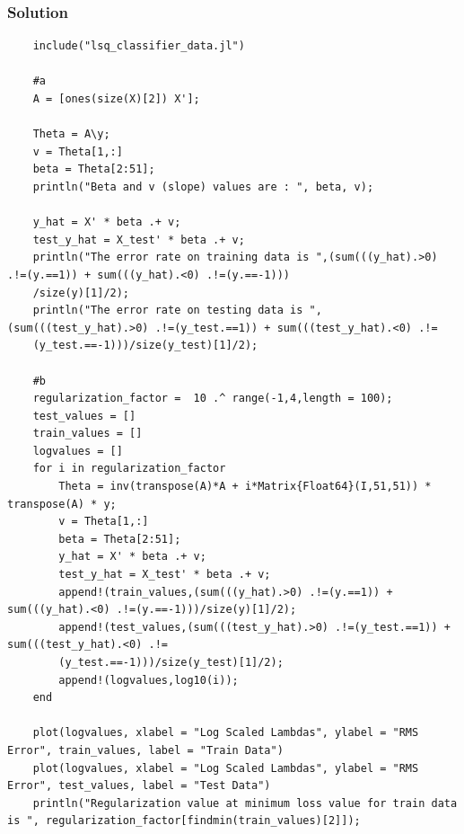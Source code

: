 \documentclass{article}
\begin{document}
\subsubsection*{Solution}
    \begin{verbatim}
    include("lsq_classifier_data.jl")
    
    #a
    A = [ones(size(X)[2]) X'];
    
    Theta = A\y;
    v = Theta[1,:]
    beta = Theta[2:51];
    println("Beta and v (slope) values are : ", beta, v);
    
    y_hat = X' * beta .+ v;
    test_y_hat = X_test' * beta .+ v;
    println("The error rate on training data is ",(sum(((y_hat).>0) .!=(y.==1)) + sum(((y_hat).<0) .!=(y.==-1)))
    /size(y)[1]/2);
    println("The error rate on testing data is ",(sum(((test_y_hat).>0) .!=(y_test.==1)) + sum(((test_y_hat).<0) .!=
    (y_test.==-1)))/size(y_test)[1]/2);
    
    #b
    regularization_factor =  10 .^ range(-1,4,length = 100);
    test_values = []
    train_values = []
    logvalues = []
    for i in regularization_factor
        Theta = inv(transpose(A)*A + i*Matrix{Float64}(I,51,51)) * transpose(A) * y;
        v = Theta[1,:]
        beta = Theta[2:51];
        y_hat = X' * beta .+ v;
        test_y_hat = X_test' * beta .+ v;
        append!(train_values,(sum(((y_hat).>0) .!=(y.==1)) + sum(((y_hat).<0) .!=(y.==-1)))/size(y)[1]/2);
        append!(test_values,(sum(((test_y_hat).>0) .!=(y_test.==1)) + sum(((test_y_hat).<0) .!=
        (y_test.==-1)))/size(y_test)[1]/2);
        append!(logvalues,log10(i));
    end
    
    plot(logvalues, xlabel = "Log Scaled Lambdas", ylabel = "RMS Error", train_values, label = "Train Data")
    plot(logvalues, xlabel = "Log Scaled Lambdas", ylabel = "RMS Error", test_values, label = "Test Data")
    println("Regularization value at minimum loss value for train data is ", regularization_factor[findmin(train_values)[2]]);
    \end{verbatim}
\end{document}
